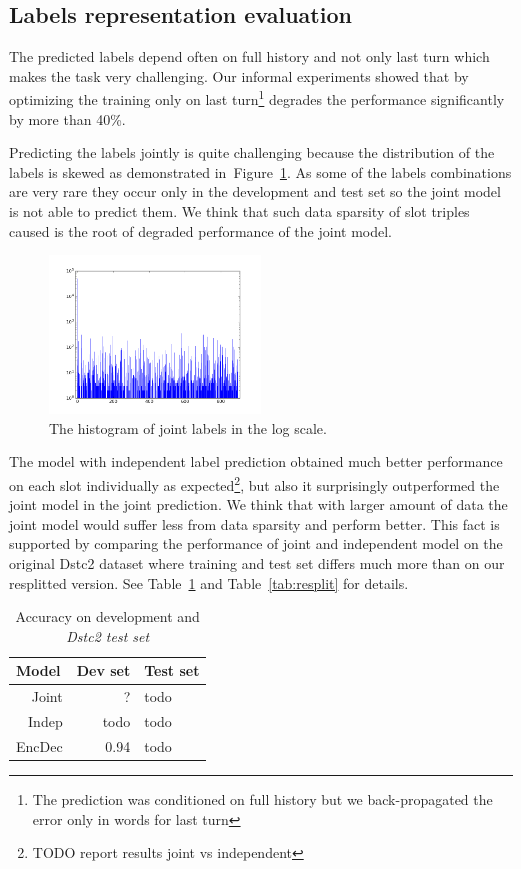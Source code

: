 \documentclass{itatnew}
\begin{document}
\subsection{Labels representation evaluation}
\label{sec:eval}
The predicted labels depend often on full history and not only last turn which makes the task very challenging.
Our informal experiments showed that by optimizing the training only on last turn\footnote{The prediction was conditioned on full history but we back-propagated the error only in words for last turn} degrades the performance significantly by more than 40\%. 

Predicting the labels jointly is quite challenging because the distribution of the labels is skewed as demonstrated in~Figure~\ref{fig:labels}.
As some of the labels combinations are very rare they occur only in the development and test set so the joint model is not able to predict them.
We think that such data sparsity of slot triples caused is the root of degraded performance of the joint model.
\begin{figure}
\includegraphics[width=0.5\textwidth]{dstc2_goals_joint_log_scale}
\caption{The histogram of joint labels in the log scale.}
\label{fig:labels}
\end{figure}

The model with independent label prediction obtained much better performance on each slot individually as expected\footnote{TODO report results joint vs independent}, but also it surprisingly outperformed the joint model in the joint prediction.
We think that with larger amount of data the joint model would suffer less from data sparsity and perform better.
This fact is supported by comparing the performance of joint and independent model on the original Dstc2 dataset where training and test set differs much more than on our resplitted version. 
See Table~\ref{tab:dstc} and Table~\ref{tab:resplit} for details.

\begin{table}
\caption{Accuracy on development and {\it Dstc2 test set }}
\begin{center}
\begin{tabular}{r@{\quad}rll}
\hline
\multicolumn{1}{l}{\rule{0pt}{12pt}
                   Model}&\multicolumn{1}{l}{Dev set}&\multicolumn{2}{l}{Test set}\\[2pt]
\hline\rule{0pt}{12pt}
Joint  &     ?&  todo \\
Indep  &   todo& todo \\
EncDec &   0.94 & todo \\
\hline
\end{tabular}
\end{center}
\label{tab:dstc}
\end{table}
\end{document}
